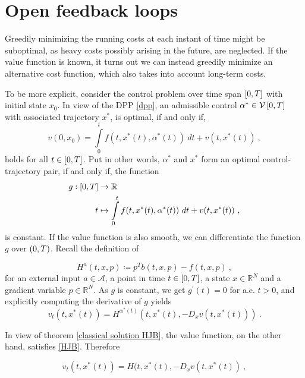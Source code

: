 \section{Open feedback loops}

Greedily minimizing the running costs at each instant of time might be suboptimal, as heavy costs possibly arising in the future, are neglected. If the value function is known, it turns out we can instead greedily minimize an alternative  cost function, which also takes into account long-term costs.

To be more explicit, consider the control problem over time span $ \left[ 0, T \right] $ with initial state $ x_0 $. In view of the DPP \eqref{dpp}, an admissible control $ \alpha^* \in \mathcal{V}\left[ {0}, T \right] $ with associated trajectory $ x^* $, is optimal, if and only if,
\begin{equation*}
	v(0, x_0) = \int\limits_{0}^{t} f(t, x^{*}(t), \alpha^{*}(t)) \  dt + v(t, x^{*}(t)) \ ,
\end{equation*}
holds for all $ t \in \left[ 0, T \right] $. Put in other words, $ \alpha^* $ and $ x^* $ form an optimal control-trajectory pair, if and only if, the function
\begin{align*}
	g : \left[ 0, T \right] &\to \mathbb{R} \\
	t &\mapsto \int\limits_{0}^{t} f(t, x^{*}(t), \alpha^{*}(t)) \  dt + v(t, x^{*}(t)) \ ,
\end{align*}
is constant. If the value function is also smooth, we can differentiate the function $ g $ over $ \left(0, T\right) $. Recall the definition of

\begin{equation*}
	H^a(t, x, p) \coloneqq p^T b(t, x, p) - f(t, x, p) \ ,
\end{equation*}
for an external input $ a \in \mathcal{A} $, a point in time $ t \in \left[ 0, T \right] $, a state $ x \in \mathbb{R}^N $ and a gradient variable $ p \in \mathbb{R}^N $.
As $ g $ is constant, we get $ g^{\prime}(t) = 0 $ for a.e. $ t > 0 $, and explicitly computing the derivative of $ g $ yields
\begin{equation}
\label{control Hamiltonian}
	v_t(t, x^{*}(t)) = H^{\alpha^{*}(t)}(t, x^{*}(t), -D_x v(t, x^{*}(t))) \ .
\end{equation}

In view of theorem \ref{classical solution HJB}, the value function, on the other hand, satisfies \eqref{HJB}. Therefore

\begin{equation}
	\label{supremum Hamiltonian}
	v_t(t, x^{*}(t)) = H(t, x^{*}(t), -D_x v(t, x^{*}(t)) \ ,
\end{equation}

